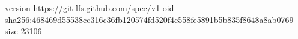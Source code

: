 version https://git-lfs.github.com/spec/v1
oid sha256:468469d55538cc316c36fb120574fd520f4c558fe5891b5b835f8648a8ab0769
size 23106
